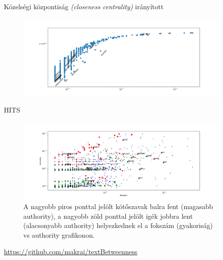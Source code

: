 \documentclass{beamer}
\newlength{\sepwid}
\newlength{\twocolwid}
\begin{document}
\begin{frame}[t]
\begin{columns}[t]
    \begin{column}{\sepwid} \end{column}			%


      \begin{column}{\twocolwid} %
        \begin{block}{Közelségi központiság \emph{(closeness centrality)}}
          irányított
          \begin{figure}[h]
            \begin{center}
              \includegraphics[width=\columnwidth]{current-flow-closeness.png}
            \end{center}
                \label{fig:closeness}
          \end{figure}
        \end{block}

        \begin{block}{HITS}
          \begin{figure}[h]
            \begin{center}
              \includegraphics[width=\columnwidth]{conj-verb-auth.png}
                  \caption{%
                  A nagyobb piros ponttal jelölt kötőszavak balra fent
                  (magasabb authority),
                  a nagyobb zöld ponttal jelölt igék jobbra lent
                  (alacsonyabb authority)
                  helyezkednek el
                  a fokszám (gyakoriság) vs authority grafikonon.}
            \end{center}
                \label{fig:hits-auth}
          \end{figure}
            \begin{center}
            \url{https://github.com/makrai/textBetweenness}
            \end{center}
        \end{block}
      \end{column}


\end{columns}
\end{frame}
\end{document}
